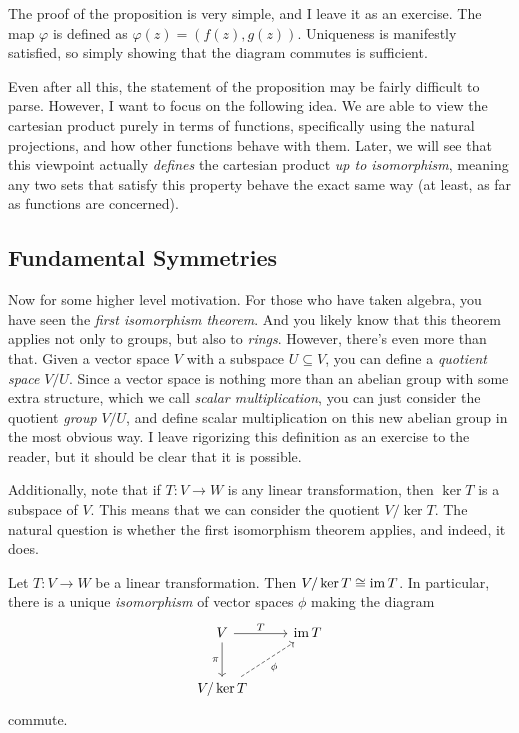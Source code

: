 The proof of the proposition is very simple, and I leave it as an exercise. The map $\varphi $ is defined as $\varphi (z)=(f(z),g(z))$. Uniqueness is manifestly satisfied, so simply showing that the diagram commutes is sufficient.

Even after all this, the statement of the proposition may be fairly difficult to parse. However, I want to focus on the following idea. We are able to view the cartesian product purely in terms of functions, specifically using the natural projections, and how other functions behave with them. Later, we will see that this viewpoint actually \emph{defines} the cartesian product \emph{up to isomorphism}, meaning any two sets that satisfy this property behave the exact same way (at least, as far as functions are concerned).

\subsection{Fundamental Symmetries}

Now for some higher level motivation. For those who have taken algebra, you have seen the \emph{first isomorphism theorem}. And you likely know that this theorem applies not only to groups, but also to \emph{rings}. However, there's even more than that. Given a vector space $V$ with a subspace $U\subseteq V$, you can define a \emph{quotient space} $V/U$. Since a vector space is nothing more than an abelian group with some extra structure, which we call \emph{scalar multiplication}, you can just consider the quotient \emph{group} $V/U$, and define scalar multiplication on this new abelian group in the most obvious way. I leave rigorizing this definition as an exercise to the reader, but it should be clear that it is possible.

Additionally, note that if $T : V \to W$ is any linear transformation, then $\ker T$ is a subspace of $V$. This means that we can consider the quotient $V/\ker T$. The natural question is whether the first isomorphism theorem applies, and indeed, it does.
\begin{theorem}\label{thm:1}
	Let $T : V \to W$ be a linear transformation. Then $V/\ker T\cong \operatorname{im} T$. In particular, there is a unique \emph{isomorphism} of vector spaces $\phi $ making the diagram
	\[\begin{tikzcd}[row sep = 2.5em, column sep = 2.5em]
	V\ar[" \pi  "', d] \ar[" T ", r]  & \im T \\
	V/\ker T \ar[" \phi  "', dashed, ur]  & 
	\end{tikzcd}\]
	commute.
\end{theorem}

